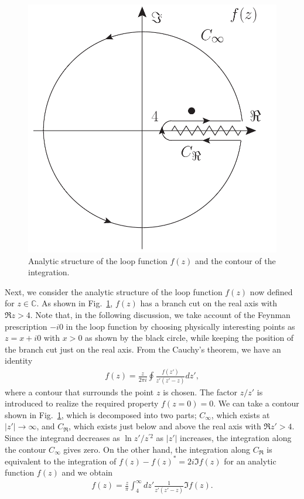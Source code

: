 \documentclass[12pt,twoside,book]{article}
\begin{document}
\begin{figure}[t]
  \centering
  \includegraphics[width=0.5\hsize]{Analytic-loop-function.pdf}
  \caption{Analytic structure of the loop function $f(z)$ and the contour of the integration.}
  \label{fig:analytic}
\end{figure}

Next, we consider the analytic structure of the loop function $f(z)$ now defined for $z \in \mathbb{C}$.
As shown in Fig.~\ref{fig:analytic}, $f(z)$ has a branch cut on the real axis with $\Re z > 4$.
Note that, in the following discussion, we take account of the Feynman prescription $-i 0$ in the loop function by choosing physically interesting points as $z = x + i0$ with $x > 0$ as shown by the black circle, while keeping the position of the branch cut just on the real axis.
From the Cauchy's theorem, we have an identity
\begin{align}
  f(z) = \frac{z}{2\pi i} \oint \frac{f(z')}{z' (z' - z)} dz',
\end{align}
where a contour that surrounds the point $z$ is chosen.
The factor $z/z'$ is introduced to realize the required property $f(z=0) = 0$.
We can take a contour shown in Fig.~\ref{fig:analytic}, which is decomposed into two parts; $C_\infty$, which exists at $|z'| \to \infty$, and $C_{\Re}$, which exists just below and above the real axis with $\Re z' > 4$.
Since the integrand decreases as $\ln z' / z^{'2}$ as $|z'|$ increases, the integration along the contour $C_\infty$ gives zero.
On the other hand, the integration along $C_\Re$ is equivalent to the integration of $f(z) - f(z)^{*} = 2i \Im f(z)$ for an analytic function $f(z)$ and we obtain
\begin{align}
  f(z) = \frac{z}{\pi} \int_4^\infty dz' \frac{1}{z' (z'-z)} \Im f(z).
  \label{eq:ffromimf}
\end{align}
\end{document}

